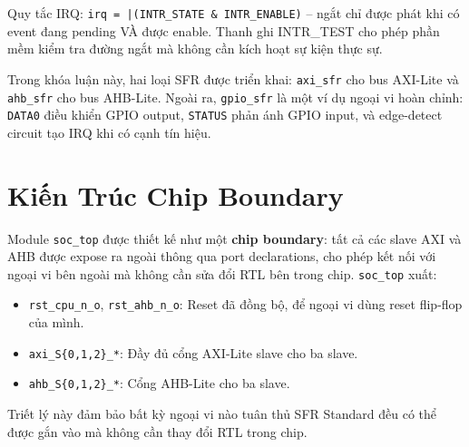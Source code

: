 Quy tắc IRQ: \texttt{irq = |(INTR\_STATE \& INTR\_ENABLE)} -- ngắt chỉ được phát khi có event đang pending VÀ được enable. Thanh ghi INTR\_TEST cho phép phần mềm kiểm tra đường ngắt mà không cần kích hoạt sự kiện thực sự.

Trong khóa luận này, hai loại SFR được triển khai: \texttt{axi\_sfr} cho bus AXI-Lite và \texttt{ahb\_sfr} cho bus AHB-Lite. Ngoài ra, \texttt{gpio\_sfr} là một ví dụ ngoại vi hoàn chỉnh: \texttt{DATA0} điều khiển GPIO output, \texttt{STATUS} phản ánh GPIO input, và edge-detect circuit tạo IRQ khi có cạnh tín hiệu.

\section{Kiến Trúc Chip Boundary}

Module \texttt{soc\_top} được thiết kế như một \textbf{chip boundary}: tất cả các slave AXI và AHB được expose ra ngoài thông qua port declarations, cho phép kết nối với ngoại vi bên ngoài mà không cần sửa đổi RTL bên trong chip. \texttt{soc\_top} xuất:

\begin{itemize}
    \item \texttt{rst\_cpu\_n\_o}, \texttt{rst\_ahb\_n\_o}: Reset đã đồng bộ, để ngoại vi dùng reset flip-flop của mình.
    \item \texttt{axi\_S\{0,1,2\}\_*}: Đầy đủ cổng AXI-Lite slave cho ba slave.
    \item \texttt{ahb\_S\{0,1,2\}\_*}: Cổng AHB-Lite cho ba slave.
\end{itemize}

Triết lý này đảm bảo bất kỳ ngoại vi nào tuân thủ SFR Standard đều có thể được gắn vào mà không cần thay đổi RTL trong chip.
